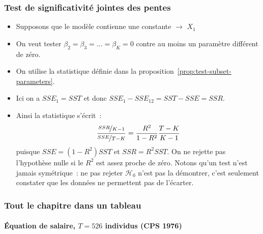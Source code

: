 \documentclass[10pt]{beamer}
\begin{document}
\begin{frame}
  \frametitle{Test de significativité jointes des pentes}

  \begin{itemize}

  \item Supposons que le modèle contienne une constante $\rightarrow$ $X_1$\newline

  \item On veut tester $\beta_2=\beta_3=\dots=\beta_K=0$ contre au moins un paramètre différent de zéro.\newline

  \item On utilise la statistique définie dans la proposition~\ref{prop:test-subset-parameters}.\newline

  \item Ici on a $SSE_1 = SST$ et donc $SSE_1-SSE_{12} = SST - SSE = SSR$.\newline

  \item Ainsi la statistique s'écrit~:
    \[
      \frac{\nicefrac{SSR}{K-1}}{\nicefrac{SSE}{T-K}} = \frac{R^2}{1-R^2}\frac{T-K}{K-1}
    \]
    puisque $SSE = (1-R^2)SST$ et $SSR = R^2SST$. On ne rejette pas l'hypothèse nulle si le $R^2$ est assez proche de zéro. Notons qu'un test n'est jamais symétrique~: ne pas rejeter $\mathcal H_0$ n'est pas la démontrer, c'est seulement constater que les données ne permettent pas de l'écarter.

  \end{itemize}


\end{frame}


\begin{frame}[c]
  \frametitle{Tout le chapitre dans un tableau}
  \framesubtitle{Équation de salaire, $T=526$ individus (CPS 1976)}

  \begin{center}
    \small
    \renewcommand{\arraystretch}{1.25}
    \setlength{\tabcolsep}{4pt}
    

    \bigskip

    \footnotesize
    
  \end{center}

\end{frame}
\end{document}
